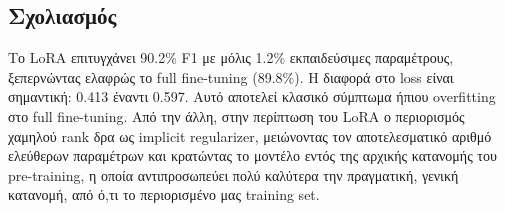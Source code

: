 \documentclass[12pt]{article}
\begin{document}
\subsection{Σχολιασμός}

Το LoRA επιτυγχάνει 90.2\% F1 με μόλις 1.2\% εκπαιδεύσιμες
παραμέτρους, ξεπερνώντας ελαφρώς το full fine-tuning (89.8\%).
Η διαφορά στο loss είναι σημαντική: 0.413 έναντι 0.597.
Αυτό αποτελεί κλασικό σύμπτωμα ήπιου overfitting στο full
fine-tuning. Από την άλλη, στην περίπτωση του LoRA
ο περιορισμός χαμηλού rank δρα ως implicit regularizer,
μειώνοντας τον αποτελεσματικό αριθμό ελεύθερων παραμέτρων και
κρατώντας το μοντέλο εντός της αρχικής κατανομής του pre-training, η οποία αντιπροσωπεύει πολύ καλύτερα την πραγματική, γενική κατανομή, από ό,τι το περιορισμένο μας training set.
\end{document}
